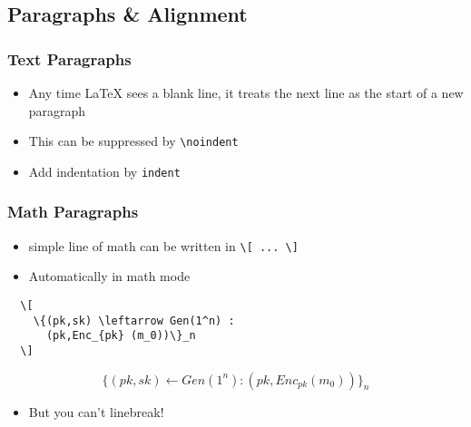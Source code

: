 \documentclass{beamer}
\begin{document}
\subsection{Paragraphs \& Alignment}
\begin{frame}[fragile]
	\frametitle{Text Paragraphs}
  \begin{itemize}
    \item Any time LaTeX sees a blank line, it treats the next line as
      the start of a new paragraph
    \item This can be suppressed by \verb+\noindent+
    \item Add indentation by \verb+indent+
  \end{itemize}
\end{frame}

\begin{frame}[fragile]
  \frametitle{Math Paragraphs}
  \begin{itemize}
    \item simple line of math can be written in \verb+\[ ... \]+
    \item Automatically in math mode
  \end{itemize}
  \begin{verbatim}
  \[
    \{(pk,sk) \leftarrow Gen(1^n) :
      (pk,Enc_{pk} (m_0))\}_n
  \]
  \end{verbatim}
  \[
    \{(pk,sk) \leftarrow Gen(1^n) : (pk,Enc_{pk} (m_0))\}_n
  \]
  \begin{itemize}
    \item But you can't linebreak!
  \end{itemize}
\end{frame}
\end{document}
